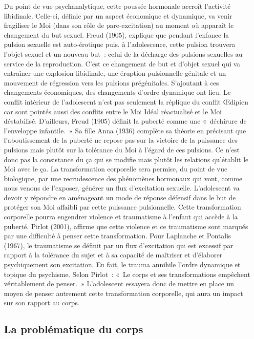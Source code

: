 \documentclass[12pt, a4paper]{book}
\begin{document}
\begin{spacing}{1.5}
Du point de vue psychanalytique, cette poussée hormonale accroît l'activité  libidinale. Celle-ci, définie par un aspect économique et dynamique, va venir fragiliser le Moi (dans son rôle de pare-excitation) au moment où apparaît le changement du but sexuel. Freud (1905),  explique que pendant l'enfance la pulsion sexuelle est auto-érotique puis, à l'adolescence,  cette pulsion trouvera l'objet sexuel et un nouveau but : celui de la décharge des pulsions sexuelles au service de la reproduction. C'est ce changement de but et d'objet sexuel qui va entraîner une explosion libidinale, une éruption pulsionnelle génitale et un mouvement de régression vers les pulsions prégénitales. S'ajoutant à ces changements économiques, des changements d'ordre dynamique ont lieu. Le conflit intérieur de l'adolescent n'est pas seulement la réplique du conflit Œdipien car sont pointés aussi des conflits entre le Moi Idéal réactualisé et le Moi déstabilisé. D'ailleurs, Freud (1905) définit la puberté comme une « déchirure de l'enveloppe infantile. » Sa fille Anna (1936) complète sa théorie en précisant que l'aboutissement de la puberté ne repose pas sur la victoire de la puissance des pulsions mais plutôt sur la tolérance du Moi à l'égard de ces pulsions. Ce n'est donc pas la consistance du ça qui se modifie mais plutôt les relations qu'établit le Moi avec le ça.
La transformation corporelle sera permise, du point de vue biologique, par une recrudescence des phénomènes hormonaux qui vont, comme nous venons de l'exposer, générer un flux d'excitation sexuelle. L'adolescent va devoir y répondre en aménageant un mode de réponse défensif dans le but de protéger son Moi affaibli par cette puissance pulsionnelle. Cette transformation corporelle pourra engendrer violence et traumatisme à l'enfant qui accède à la puberté. Pirlot (2001),  affirme que cette violence et ce traumatisme sont marqués par une difficulté à penser cette transformation. Pour Laplanche et Pontalis (1967),  le traumatisme se définit par un flux d'excitation qui est excessif par rapport à la tolérance du sujet et à sa capacité de maîtriser et d'élaborer psychiquement son excitation. En fait, le trauma annihile l'ordre dynamique et topique du psychisme. Selon Pirlot : « Le corps et ses transformations empêchent véritablement de penser. »
L'adolescent essayera donc de mettre en place un moyen de penser autrement cette transformation corporelle, qui aura un impact sur son rapport au corps.

\subsection{La problématique du corps}


\end{spacing}
\end{document}
